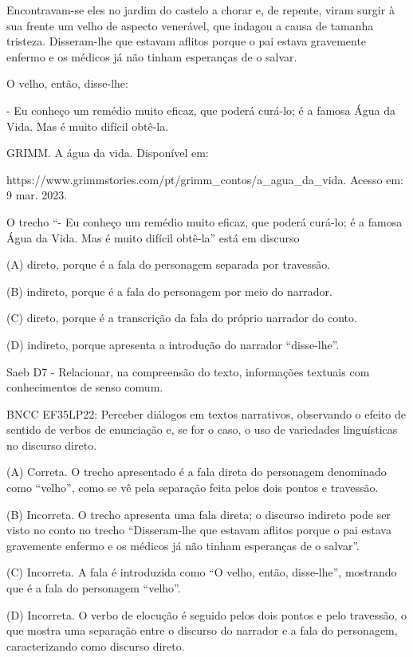 \begin{itemize}
{{{\begin{itemize}
\begin{itemize}
\begin{itemize}
Encontravam-se eles no jardim do castelo a chorar e, de repente, viram
surgir à sua frente um velho de aspecto venerável, que indagou a causa
de tamanha tristeza. Disseram-lhe que estavam aflitos porque o pai
estava gravemente enfermo e os médicos já não tinham esperanças de o
salvar.

O velho, então, disse-lhe:

- Eu conheço um remédio muito eficaz, que poderá curá-lo; é a famosa
Água da Vida. Mas é muito difícil obtê-la.

GRIMM. A água da vida. Disponível em:

https://www.grimmstories.com/pt/grimm\_contos/a\_agua\_da\_vida. Acesso
em: 9 mar. 2023.

O trecho ``- Eu conheço um remédio muito eficaz, que poderá curá-lo; é a
famosa Água da Vida. Mas é muito difícil obtê-la'' está em discurso

(A) direto, porque é a fala do personagem separada por travessão.

(B) indireto, porque é a fala do personagem por meio do narrador.

(C) direto, porque é a transcrição da fala do próprio narrador do conto.

(D) indireto, porque apresenta a introdução do narrador ``disse-lhe''.

Saeb D7 - Relacionar, na compreensão do texto, informações textuais com
conhecimentos de senso comum.

BNCC EF35LP22: Perceber diálogos em textos narrativos, observando o
efeito de sentido de verbos de enunciação e, se for o caso, o uso de
variedades linguísticas no discurso direto.

(A) Correta. O trecho apresentado é a fala direta do personagem
denominado como ``velho'', como se vê pela separação feita pelos dois
pontos e travessão.

(B) Incorreta. O trecho apresenta uma fala direta; o discurso indireto
pode ser visto no conto no trecho ``Disseram-lhe que estavam aflitos
porque o pai estava gravemente enfermo e os médicos já não tinham
esperanças de o salvar''.

(C) Incorreta. A fala é introduzida como ``O velho, então, disse-lhe'',
mostrando que é a fala do personagem ``velho''.

(D) Incorreta. O verbo de elocução é seguido pelos dois pontos e pelo
travessão, o que mostra uma separação entre o discurso do narrador e a
fala do personagem, caracterizando como discurso direto.


\end{itemize}
\end{itemize}
\end{itemize}}}}
\end{itemize}
